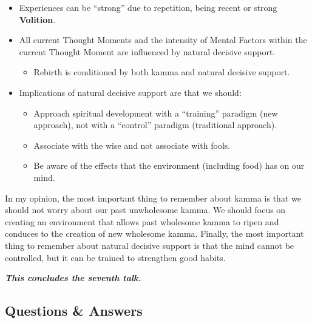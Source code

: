\begin{itemize}
\begin{itemize}
\end{itemize}

\item Experiences can be “strong” due to repetition, being recent or strong \textbf{Volition}.

\item All current Thought Moments and the intensity of Mental Factors within the current Thought Moment are influenced by natural decisive support.

\begin{itemize}

\item Rebirth is conditioned by both kamma and natural decisive support.

\end{itemize}

\item Implications of natural decisive support are that we should:

\begin{itemize}

\item Approach spiritual development with a “training” paradigm (new approach), not with a “control” paradigm (traditional approach).

\item Associate with the wise and not associate with fools.

\item Be aware of the effects that the environment (including food) has on our mind.

\end{itemize}

\end{itemize}

In my opinion, the most important thing to remember about kamma is that we should not worry about our past unwholesome kamma. We should focus on creating an environment that allows past wholesome kamma to ripen and conduces to the creation of new wholesome kamma. Finally, the most important thing to remember about natural decisive support is that the mind cannot be controlled, but it can be trained to strengthen good habits.

\begin{center}
\textbf{\textit{This concludes the seventh talk.}} \\
\end{center}

\newpage

\subsection*{Questions \& Answers}

